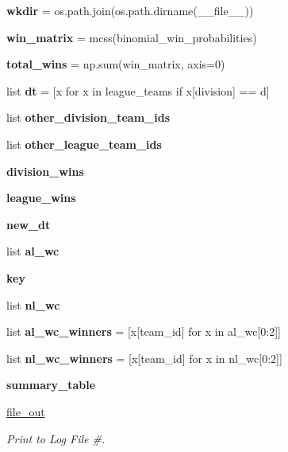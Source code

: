 \begin{DoxyCompactItemize}
\item 
{\bfseries wkdir} = os.\+path.\+join(os.\+path.\+dirname(\+\_\+\+\_\+file\+\_\+\+\_\+))\hypertarget{namespacemcss_ae6fb0b085c3a4430b0c54aa0803e0932}{}\label{namespacemcss_ae6fb0b085c3a4430b0c54aa0803e0932}

\item 
{\bfseries win\+\_\+matrix} = mcss(binomial\+\_\+win\+\_\+probabilities)\hypertarget{namespacemcss_af3d0af907e5403df5026d9463d7c081b}{}\label{namespacemcss_af3d0af907e5403df5026d9463d7c081b}

\item 
{\bfseries total\+\_\+wins} = np.\+sum(win\+\_\+matrix, axis=0)\hypertarget{namespacemcss_a7950eb7ff9ce9bc663df507dcfb5ad3b}{}\label{namespacemcss_a7950eb7ff9ce9bc663df507dcfb5ad3b}

\item 
list {\bfseries dt} = \mbox{[}x for x in league\+\_\+teams if x\mbox{[}\textquotesingle{}division\textquotesingle{}\mbox{]} == d\mbox{]}\hypertarget{namespacemcss_a84688ca2c99d77d484ac7f3f77d62d55}{}\label{namespacemcss_a84688ca2c99d77d484ac7f3f77d62d55}

\item 
list {\bfseries other\+\_\+division\+\_\+team\+\_\+ids}
\item 
list {\bfseries other\+\_\+league\+\_\+team\+\_\+ids}
\item 
{\bfseries division\+\_\+wins}
\item 
{\bfseries league\+\_\+wins}
\item 
{\bfseries new\+\_\+dt}
\item 
list {\bfseries al\+\_\+wc}
\item 
{\bfseries key}\hypertarget{namespacemcss_a621add2c31a418a7dbbe75b049ba0d43}{}\label{namespacemcss_a621add2c31a418a7dbbe75b049ba0d43}

\item 
list {\bfseries nl\+\_\+wc}
\item 
list {\bfseries al\+\_\+wc\+\_\+winners} = \mbox{[}x\mbox{[}\textquotesingle{}team\+\_\+id\textquotesingle{}\mbox{]} for x in al\+\_\+wc\mbox{[}0\+:2\mbox{]}\mbox{]}\hypertarget{namespacemcss_a5880f4b7d1465920413bee7738a5d98c}{}\label{namespacemcss_a5880f4b7d1465920413bee7738a5d98c}

\item 
list {\bfseries nl\+\_\+wc\+\_\+winners} = \mbox{[}x\mbox{[}\textquotesingle{}team\+\_\+id\textquotesingle{}\mbox{]} for x in nl\+\_\+wc\mbox{[}0\+:2\mbox{]}\mbox{]}\hypertarget{namespacemcss_a861f974161cf9dc8b5c3f65b5c09ccb9}{}\label{namespacemcss_a861f974161cf9dc8b5c3f65b5c09ccb9}

\item 
{\bfseries summary\+\_\+table}
\item 
\hyperlink{namespacemcss_a4ffc2357edc2e03044c10aef3db8a7eb}{file\+\_\+out}
\begin{DoxyCompactList}\small\item\em Print to Log File \#. \end{DoxyCompactList}\end{DoxyCompactItemize}


